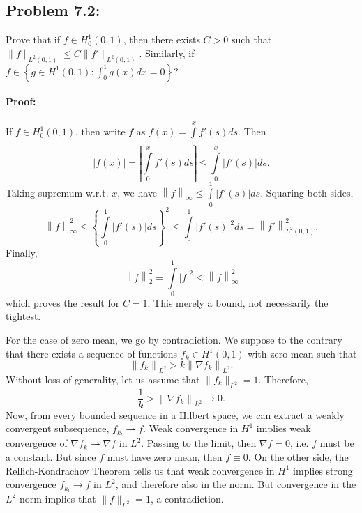 \documentclass[letterpaper,twoside,11pt]{article}
\theoremstyle{mystyle}
\begin{document}
\newpage 
\subsection*{Problem 7.2:}
Prove that if $f \in H_0^1\left( 0,1 \right)$, then there exists $C>0$ such that $\|f\|_{L^2(0,1)} \leq C \|f'\|_{L^2(0,1)}$. 
Similarly, if $f \in \left\{ g \in H^1(0,1) : \int_0^1 g(x) dx = 0 \right\}$?

\paragraph*{Proof: } If $f \in H_0^1\left( 0,1 \right)$, then write $f$ as $f\left( x \right) = \int\limits_0^x {f'\left( s \right)ds} .$
Then 
\[\left| {f\left( x \right)} \right| = \left| {\int\limits_0^x {f'\left( s \right)ds} } \right| \leqslant \int\limits_0^x {\left| {f'\left( s \right)} \right|ds} .\]
Taking supremum w.r.t. $x$, we have ${\left\| f \right\|_\infty } \leqslant \int\limits_0^1 {\left| {f'\left( s \right)} \right|ds} $. Squaring both sides, 
\[\left\| f \right\|_\infty ^2 \leqslant {\left\{ {\int\limits_0^1 {\left| {f'\left( s \right)} \right|ds} } \right\}^2} \leqslant \int\limits_0^1 {{{\left| {f'\left( s \right)} \right|}^2}ds}  = \left\| {f'} \right\|_{{L^2}\left( {0,1} \right)}^2.\]
Finally, 
\[\left\| f \right\|_2^2 = \int\limits_0^1 {{{\left| f \right|}^2}}  \leqslant \left\| f \right\|_\infty ^2\]
which proves the result for $C=1$. This merely a bound, not necessarily the tightest. 

For the case of zero mean, we go by contradiction. We suppose to the contrary that there exists a sequence of functions $f_k \in H^1\left( 0,1 \right)$ with zero mean such that 
\[{\left\| {{f_k}} \right\|_{{L^2}}} > k{\left\| {\nabla {f_k}} \right\|_{{L^2}}}.\] 
Without loss of generality, let us assume that $\|f_k\|_{L^2} = 1$. Therefore, \[\frac{1}{k} > {\left\| {\nabla {f_k}} \right\|_{{L^2}}} \to 0.\]
Now, from every bounded sequence in a Hilbert space, we can extract a weakly convergent subsequence, $f_{k_l} \rightharpoonup f$. Weak convergence in $H^1$ implies weak convergence of $\nabla f_k \rightharpoonup \nabla f$ in $L^2$. Passing to the limit, then $\nabla f = 0$, i.e. $f$ must be a constant. But since $f$ must have zero mean, then $f \equiv 0$. 
On the other side, the Rellich-Kondrachov Theorem tells us that weak convergence in $H^1$ implies strong convergence $f_{k_l} \to f$ in $L^2$, and therefore also in the norm. But convergence in the $L^2$ norm implies that $\|f\|_{L^2} = 1$, a contradiction. 
\end{document}
